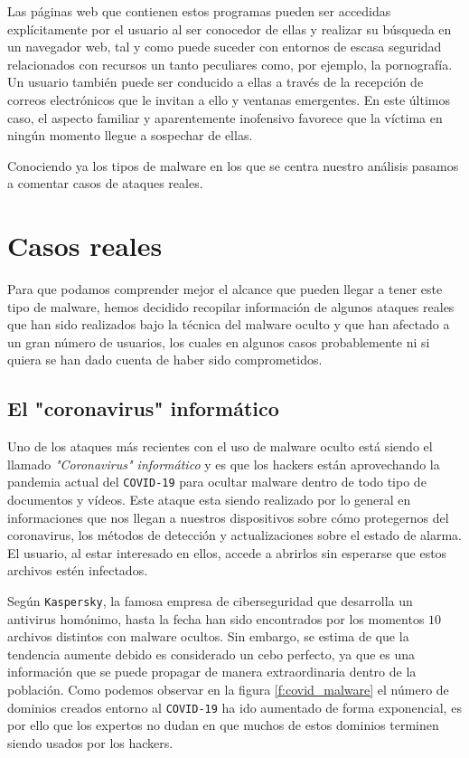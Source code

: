 \documentclass[12pt]{article}
\newcommand{\newpar} {
    \vskip 0.5cm
}
\begin{document}
            \newpar

            Las páginas web que contienen estos programas pueden ser accedidas explícitamente por el usuario al ser conocedor de ellas y realizar su búsqueda en un navegador web, tal y como puede suceder con entornos de escasa seguridad relacionados con recursos un tanto peculiares como, por ejemplo, la pornografía. Un usuario también puede ser conducido a ellas a través de la recepción de correos electrónicos que le invitan a ello y ventanas emergentes. En este últimos caso, el aspecto familiar y aparentemente inofensivo favorece que la víctima en ningún momento llegue a sospechar de ellas.

            \newpar

            Conociendo ya los tipos de malware en los que se centra nuestro análisis pasamos a comentar casos de ataques reales.

    \section{Casos reales}
        Para que podamos comprender mejor el alcance que pueden llegar a tener este tipo de malware, hemos decidido recopilar información de algunos ataques reales que han sido realizados bajo la técnica del malware oculto y que han afectado a un gran número de usuarios, los cuales en algunos casos probablemente ni si quiera se han dado cuenta de haber sido comprometidos.

        \subsection{El "coronavirus" informático}
            Uno de los ataques más recientes con el uso de malware oculto está siendo el llamado \textit{"Coronavirus" informático} y es que los hackers están aprovechando la pandemia actual del \texttt{COVID-19} para ocultar malware dentro de todo tipo de documentos y vídeos. Este ataque esta siendo realizado por lo general en informaciones que nos llegan a nuestros dispositivos sobre cómo protegernos del coronavirus, los métodos de detección y actualizaciones sobre el estado de alarma. El usuario, al estar interesado en ellos, accede a abrirlos sin esperarse que estos archivos estén infectados.

            \newpar

            Según \texttt{Kaspersky}, la famosa empresa de ciberseguridad que desarrolla un antivirus homónimo, hasta la fecha han sido encontrados por los momentos $10$ archivos distintos con malware ocultos. Sin embargo, se estima de que la tendencia aumente debido es considerado un cebo perfecto, ya que es una información que se puede propagar de manera extraordinaria dentro de la población. Como podemos observar en la figura \ref{f:covid_malware} el número de dominios creados entorno al \texttt{COVID-19} ha ido aumentado de forma exponencial, es por ello que los expertos no dudan en que muchos de estos dominios terminen siendo usados por los hackers.
\end{document}
